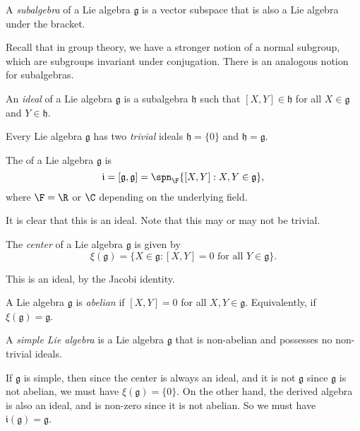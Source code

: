 \documentclass[a4paper]{article}
\begin{document}
\begin{defi}[Subalgebra]
  A \emph{subalgebra} of a Lie algebra $\mathfrak{g}$ is a vector subspace that is also a Lie algebra under the bracket.
\end{defi}

Recall that in group theory, we have a stronger notion of a normal subgroup, which are subgroups invariant under conjugation. There is an analogous notion for subalgebras.
\begin{defi}[Ideal]
  An \emph{ideal} of a Lie algebra $\mathfrak{g}$ is a subalgebra $\mathfrak{h}$ such that $[X, Y] \in \mathfrak{h}$ for all $X \in \mathfrak{g}$ and $Y \in \mathfrak{h}$.
\end{defi}

\begin{eg}
  Every Lie algebra $\mathfrak{g}$ has two \emph{trivial} ideals $\mathfrak{h} = \{0\}$ and $\mathfrak{h} = \mathfrak{g}$.
\end{eg}

\begin{defi}
  The  of a Lie algebra $\mathfrak{g}$ is
  \[
    \mathfrak{i} = [\mathfrak{g}, \mathfrak{g}] = \spn_\F\{[X, Y]: X, Y \in \mathfrak{g}\},
  \]
  where $\F = \R$ or $\C$ depending on the underlying field.
\end{defi}
It is clear that this is an ideal. Note that this may or may not be trivial.

\begin{defi}
  The \emph{center} of a Lie algebra $\mathfrak{g}$ is given by
  \[
    \xi(\mathfrak{g}) = \{X \in \mathfrak{g}: [X, Y] = 0\text{ for all }Y \in \mathfrak{g}\}.
  \]
\end{defi}
This is an ideal, by the Jacobi identity.

\begin{defi}
  A Lie algebra $\mathfrak{g}$ is \emph{abelian} if $[X, Y] = 0$ for all $X, Y \in \mathfrak{g}$. Equivalently, if $\xi(\mathfrak{g}) = \mathfrak{g}$.
\end{defi}

\begin{defi}
  A \emph{simple Lie algebra} is a Lie algebra $\mathfrak{g}$ that is non-abelian and possesses no non-trivial ideals.
\end{defi}
If $\mathfrak{g}$ is simple, then since the center is always an ideal, and it is not $\mathfrak{g}$ since $\mathfrak{g}$ is not abelian, we must have $\xi(\mathfrak{g}) = \{0\}$. On the other hand, the derived algebra is also an ideal, and is non-zero since it is not abelian. So we must have $\mathfrak{i}(\mathfrak{g}) = \mathfrak{g}$.
\end{document}
